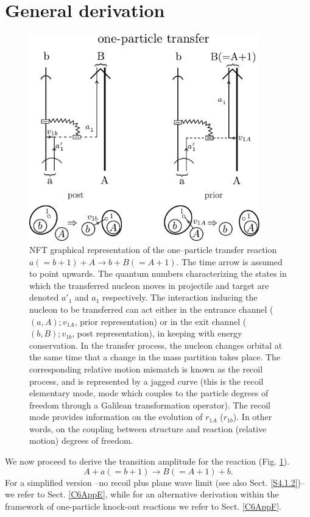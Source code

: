 \section{General derivation}\label{C4S1}
\begin{figure}
\centerline{\includegraphics*[width=10cm,angle=0]{C6/figs_C6/Reaction3}}
\caption{ NFT graphical representation of the one--particle transfer reaction $a(=b+1)+A\rightarrow b+B(=A+1)$. The time arrow is assumed to point upwards. The quantum numbers characterizing the states in which the transferred nucleon moves in projectile and target are denoted $a'_1$ and $a_1$ respectively. The interaction inducing the nucleon to be transferred can act either in the entrance channel ($(a,A);v_{1A}$, prior representation) or in the exit channel ($(b,B);v_{1b}$, post representation), in keeping with energy conservation. In the transfer process, the nucleon changes orbital at the same time that a change in the mass partition takes place. The corresponding relative motion mismatch is known as the recoil process, and is represented by a jagged curve (this is the recoil elementary mode, mode which couples to the particle degrees of freedom through a Galilean transformation operator). The recoil mode  provides information on the evolution of $r_{1A}$ ($r_{1b}$). In other words, on the coupling between structure and reaction (relative motion) degrees of freedom.}\label{fig6.1.1}
\end{figure}
We now proceed to derive the transition amplitude for the reaction (Fig. \ref{fig6.1.1}). 
\begin{equation}\label{eq_onept1}
    A+a(=b+1)\longrightarrow B(=A+1)+b.
\end{equation}
For a simplified version --no recoil plus plane wave limit (see also Sect. \ref{S4.1.2})-- we refer to Sect. \ref{C6AppE}, while for an alternative derivation within the framework of one-particle knock-out reactions we refer to Sect. \ref{C6AppF}.


